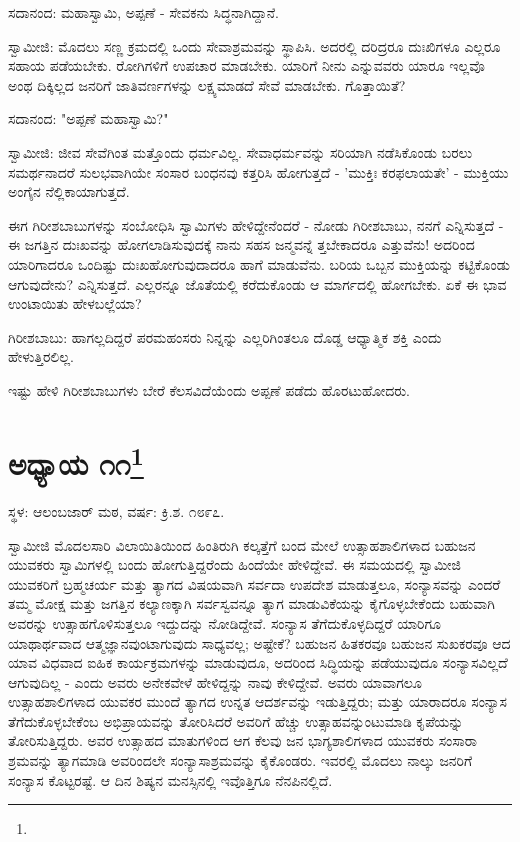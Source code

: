 ಸದಾನಂದ: ಮಹಾಸ್ವಾಮಿ, ಅಪ್ಪಣೆ - ಸೇವಕನು ಸಿದ್ಧನಾಗಿದ್ದಾನೆ.

ಸ್ವಾಮೀಜಿ: ಮೊದಲು ಸಣ್ಣ ಕ್ರಮದಲ್ಲಿ ಒಂದು ಸೇವಾಶ್ರಮವನ್ನು ಸ್ಥಾಪಿಸಿ. ಅದರಲ್ಲಿ ದರಿದ್ರರೂ ದುಃಖಿಗಳೂ ಎಲ್ಲರೂ ಸಹಾಯ ಪಡೆಯಬೇಕು. ರೋಗಿಗಳಿಗೆ ಉಪಚಾರ ಮಾಡಬೇಕು. ಯಾರಿಗೆ ನೀನು ಎನ್ನುವವರು ಯಾರೂ ಇಲ್ಲವೊ ಅಂಥ ದಿಕ್ಕಿಲ್ಲದ ಜನರಿಗೆ ಜಾತಿವರ್ಣಗಳನ್ನು ಲಕ್ಷ್ಯಮಾಡದೆ ಸೇವೆ ಮಾಡಬೇಕು. ಗೊತ್ತಾಯಿತೆ?

ಸದಾನಂದ: "ಅಪ್ಪಣೆ ಮಹಾಸ್ವಾಮಿ?"

ಸ್ವಾಮೀಜಿ: ಜೀವ ಸೇವೆಗಿಂತ ಮತ್ತೊಂದು ಧರ್ಮವಿಲ್ಲ. ಸೇವಾಧರ್ಮವನ್ನು ಸರಿಯಾಗಿ ನಡೆಸಿಕೊಂಡು ಬರಲು ಸಮರ್ಥನಾದರೆ ಸುಲಭವಾಗಿಯೇ ಸಂಸಾರ ಬಂಧನವು ಕತ್ತರಿಸಿ ಹೋಗುತ್ತದೆ - 'ಮುಕ್ತಿಃ ಕರಫಲಾಯತೇ' - ಮುಕ್ತಿಯು ಅಂಗೈನ ನೆಲ್ಲಿಕಾಯಾಗುತ್ತದೆ.

ಈಗ ಗಿರೀಶಬಾಬುಗಳನ್ನು ಸಂಬೋಧಿಸಿ ಸ್ವಾಮಿಗಳು ಹೇಳಿದ್ದೇನೆಂದರೆ - ನೋಡು ಗಿರೀಶಬಾಬು, ನನಗೆ ಎನ್ನಿಸುತ್ತದೆ - ಈ ಜಗತ್ತಿನ ದುಃಖವನ್ನು ಹೋಗಲಾಡಿಸುವುದಕ್ಕೆ ನಾನು ಸಹಸ ಜನ್ಮವನ್ನೆ ತ್ತಬೇಕಾದರೂ ಎತ್ತುವೆನು! ಅದರಿಂದ ಯಾರಿಗಾದರೂ ಒಂದಿಷ್ಟು ದುಃಖಹೋಗುವುದಾದರೂ ಹಾಗೆ ಮಾಡುವೆನು. ಬರಿಯ ಒಬ್ಬನ ಮುಕ್ತಿಯನ್ನು ಕಟ್ಟಿಕೊಂಡು ಆಗುವುದೇನು? ಎನ್ನಿಸುತ್ತದೆ. ಎಲ್ಲರನ್ನೂ ಜೊತೆಯಲ್ಲಿ ಕರೆದುಕೊಂಡು ಆ ಮಾರ್ಗದಲ್ಲಿ ಹೋಗಬೇಕು. ಏಕೆ ಈ ಭಾವ ಉಂಟಾಯಿತು ಹೇಳಬಲ್ಲೆಯಾ?

ಗಿರೀಶಬಾಬು: ಹಾಗಲ್ಲದಿದ್ದರೆ ಪರಮಹಂಸರು ನಿನ್ನನ್ನು ಎಲ್ಲರಿಗಿಂತಲೂ ದೊಡ್ಡ ಆಧ್ಯಾತ್ಮಿಕ ಶಕ್ತಿ ಎಂದು ಹೇಳುತ್ತಿರಲಿಲ್ಲ.

ಇಷ್ಟು ಹೇಳಿ ಗಿರೀಶಬಾಬುಗಳು ಬೇರೆ ಕೆಲಸವಿದೆಯೆಂದು ಅಪ್ಪಣೆ ಪಡೆದು ಹೊರಟುಹೋದರು.

\newpage

\chapter[ಅಧ್ಯಾಯ ೧೧]{ಅಧ್ಯಾಯ ೧೧\protect\footnote{}}

\begin{center}
ಸ್ಥಳ: ಆಲಂಬಜಾರ್ ಮಠ, ವರ್ಷ: ಕ್ರಿ.ಶ. ೧೮೯೭.
\end{center}

ಸ್ವಾಮೀಜಿ ಮೊದಲಸಾರಿ ವಿಲಾಯಿತಿಯಿಂದ ಹಿಂತಿರುಗಿ ಕಲ್ಕತ್ತೆಗೆ ಬಂದ ಮೇಲೆ ಉತ್ಸಾಹಶಾಲಿಗಳಾದ ಬಹುಜನ ಯುವಕರು ಸ್ವಾಮಿಗಳಲ್ಲಿ ಬಂದು ಹೋಗುತ್ತಿದ್ದರೆಂದು ಹಿಂದೆಯೇ ಹೇಳಿದ್ದೇವೆ. ಈ ಸಮಯದಲ್ಲಿ ಸ್ವಾಮೀಜಿ ಯುವಕರಿಗೆ ಬ್ರಹ್ಮಚರ್ಯ ಮತ್ತು ತ್ಯಾಗದ ವಿಷಯವಾಗಿ ಸರ್ವದಾ ಉಪದೇಶ ಮಾಡುತ್ತಲೂ, ಸಂನ್ಯಾಸವನ್ನು ಎಂದರೆ ತಮ್ಮ ಮೋಕ್ಷ ಮತ್ತು ಜಗತ್ತಿನ ಕಲ್ಯಾಣಕ್ಕಾಗಿ ಸರ್ವಸ್ವವನ್ನೂ ತ್ಯಾಗ ಮಾಡುವಿಕೆಯನ್ನು ಕೈಗೊಳ್ಳಬೇಕೆಂದು ಬಹುವಾಗಿ ಅವರನ್ನು ಉತ್ಸಾಹಗೊಳಿಸುತ್ತಲೂ ಇದ್ದುದನ್ನು ನೋಡಿದ್ದೇವೆ. ಸಂನ್ಯಾಸ ತೆಗೆದುಕೊಳ್ಳದಿದ್ದರೆ ಯಾರಿಗೂ ಯಾಥಾರ್ಥವಾದ ಆತ್ಮಜ್ಞಾನವುಂಟಾಗುವುದು ಸಾಧ್ಯವಲ್ಲ; ಅಷ್ಟೇಕೆ? ಬಹುಜನ ಹಿತಕರವೂ ಬಹುಜನ ಸುಖಕರವೂ ಆದ ಯಾವ ವಿಧವಾದ ಐಹಿಕ ಕಾರ್ಯಕ್ರಮಗಳನ್ನು ಮಾಡುವುದೂ, ಅದರಿಂದ ಸಿದ್ಧಿಯನ್ನು ಪಡೆಯುವುದೂ ಸಂನ್ಯಾಸವಿಲ್ಲದೆ ಆಗುವುದಿಲ್ಲ - ಎಂದು ಅವರು ಅನೇಕವೇಳೆ ಹೇಳಿದ್ದನ್ನು ನಾವು ಕೇಳಿದ್ದೇವೆ. ಅವರು ಯಾವಾಗಲೂ ಉತ್ಸಾಹಶಾಲಿಗಳಾದ ಯುವಕರ ಮುಂದೆ ತ್ಯಾಗದ ಉನ್ನತ ಆದರ್ಶವನ್ನು ಇಡುತ್ತಿದ್ದರು; ಮತ್ತು ಯಾರಾದರೂ ಸಂನ್ಯಾಸ ತೆಗೆದುಕೊಳ್ಳಬೇಕೆಂಬ ಅಭಿಪ್ರಾಯವನ್ನು ತೋರಿಸಿದರೆ ಅವರಿಗೆ ಹೆಚ್ಚು ಉತ್ಸಾಹವನ್ನುಂಟುಮಾಡಿ ಕೃಪೆಯನ್ನು ತೋರಿಸುತ್ತಿದ್ದರು. ಅವರ ಉತ್ಸಾಹದ ಮಾತುಗಳಿಂದ ಆಗ ಕೆಲವು ಜನ ಭಾಗ್ಯಶಾಲಿಗಳಾದ ಯುವಕರು ಸಂಸಾರಾ ಶ್ರಮವನ್ನು ತ್ಯಾಗಮಾಡಿ ಅವರಿಂದಲೇ ಸಂನ್ಯಾಸಾಶ್ರಮವನ್ನು ಕೈಕೊಂಡರು. ಇವರಲ್ಲಿ ಮೊದಲು ನಾಲ್ಕು ಜನರಿಗೆ ಸಂನ್ಯಾಸ ಕೊಟ್ಟರಷ್ಟೆ. ಆ ದಿನ ಶಿಷ್ಯನ ಮನಸ್ಸಿನಲ್ಲಿ ಇವೊತ್ತಿಗೂ ನೆನಪಿನಲ್ಲಿದೆ.

